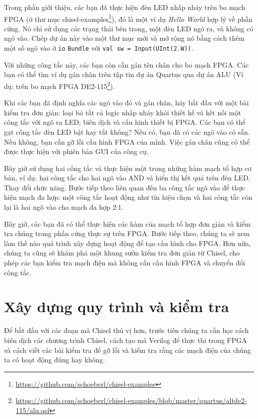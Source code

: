 \documentclass[%
    10pt,
    headinclude, footexclude,
    openright, %
    notitlepage,
    cleardoubleempty,
    headsepline,
    pointlessnumbers,
    bibtotoc, idxtotoc,
    ]{scrbook}
\newcommand{\code}[1]{{\small{\texttt{#1}}}}
\newcommand{\myref}[2]{\href{#1}{#2}}
\renewcommand{\myref}[2]{{#2}{\footnote{\url{#1}}}}
\begin{document}
Trong phần giới thiệu, các bạn đã thực hiện đèn LED nhấp nháy trên bo mạch FPGA
(ở thư mục \myref{https://github.com/schoeberl/chisel-examples}{chisel-examples}), đó là một ví dụ \emph{Hello World} 
hợp lý về phần cứng. Nó chỉ sử dụng các trạng thái bên trong, một đèn LED ngõ ra, và không có ngõ vào.
Chép dự án này vào một thư mục mới và mở rộng nó bằng cách thêm một số ngõ vào ở \code{io} \code{Bundle}
với \code{val sw = Input(UInt(2.W))}.


\noindent Với những công tắc này, các bạn còn cần gán tên chân cho bo mạch FPGA.
Các bạn có thể tìm ví dụ gán chân trên tập tin dự án Quartus qua dự án ALU
(Ví dụ: trên bo mạch \myref{https://github.com/schoeberl/chisel-examples/blob/master/quartus/altde2-115/alu.qsf}{FPGA DE2-115}).

Khi các bạn đã định nghĩa các ngõ vào đó và gán chân, hãy bắt đầu với một bài kiểm tra đơn giản: 
loại bỏ tất cả logic nhấp nháy khỏi thiết kế và kết nối một công tắc với ngõ ra LED; 
biên dịch và cấu hình thiết bị FPGA. Các bạn có thể gạt công tắc đèn LED bật hay tắt không? 
Nếu có, bạn đã có các ngõ vào có sẵn. Nếu không, bạn cần gỡ lỗi cấu hình FPGA của mình. 
Việc gán chân cũng có thể được thực hiện với phiên bản GUI của công cụ.

Bây giờ sử dụng hai công tắc và thực hiện một trong những hàm mạch tổ hợp cơ bản, 
ví dụ: hai công tắc cho hai ngõ vào AND và hiển thị kết quả trên đèn LED. Thay đổi chức năng. 
Bước tiếp theo liên quan đến ba công tắc ngõ vào để thực hiện mạch đa hợp: một công tắc hoạt động 
như tín hiệu chọn và hai công tắc còn lại là hai ngõ vào cho mạch đa hợp 2:1.

Bây giờ, các bạn đã có thể thực hiện các hàm của mạch tổ hợp đơn giản và kiểm tra chúng
trong phần cứng thực sự trên FPGA. Bước tiếp theo, chúng ta sẽ xem làm thế nào quá trình xây dựng hoạt động
để tạo cấu hình cho FPGA. Hơn nữa, chúng ta cũng sẽ khám phá một khung sườn kiểm tra đơn giản từ Chisel,
cho phép các bạn kiểm tra mạch điện mà không cần cấu hình FPGA và chuyển đổi công tắc.

\chapter{Xây dựng quy trình và kiểm tra}

Để bắt đầu với các đoạn mã Chisel thú vị hơn, trước tiên chúng ta cần học cách biên dịch
các chương trình Chisel, cách tạo mã Verilog để thực thi trong FPGA và cách viết 
các bài kiểm tra để gỡ lỗi và kiểm tra rằng các mạch điện của chúng ta có hoạt động đúng hay không.
\end{document}
